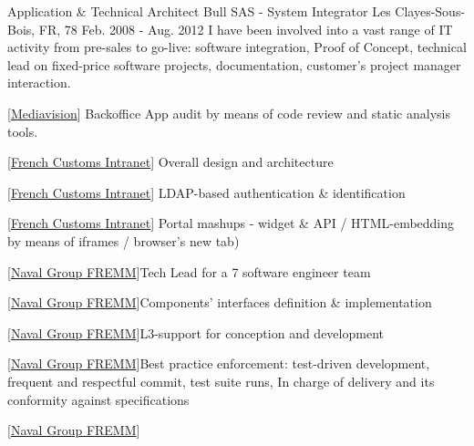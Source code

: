 \begin{cventries}
  \cventry
    {Application \& Technical Architect} %
    {Bull SAS - System Integrator} %
    {Les Clayes-Sous-Bois, FR, 78} %
    {Feb. 2008 - Aug. 2012} %
    {I have been involved into a vast range of IT activity from pre-sales to go-live: software integration, Proof of Concept, technical lead on fixed-price software projects, documentation, customer’s project manager interaction.}
    {
      \begin{cvitems} %
        \item {[\href{http://www.mediavision.fr}{Mediavision}] Backoffice App audit by means of code review and static analysis tools.}
        \item {[\href{http://www.douane.gouv.fr/articles/a13408-travel-coming-to-france-with-your-pet}{French Customs Intranet}] Overall design and architecture}
        \item {[\href{http://www.douane.gouv.fr/articles/a13408-travel-coming-to-france-with-your-pet}{French Customs Intranet}] LDAP-based authentication \& identification}
        \item {[\href{http://www.douane.gouv.fr/articles/a13408-travel-coming-to-france-with-your-pet}{French Customs Intranet}] Portal mashups - widget \& API / HTML-embedding by means of iframes / browser's new tab)}
        \item {[\href{https://www.naval-group.com/en/news/dcns-delivers-multi-mission-frigate-auvergne-the-fourth-fremm-for-the-french-navy/}{Naval Group FREMM}]Tech Lead for a 7 software engineer team}
        \item {[\href{https://www.naval-group.com/en/news/dcns-delivers-multi-mission-frigate-auvergne-the-fourth-fremm-for-the-french-navy/}{Naval Group FREMM}]Components’ interfaces definition \& implementation} 
        \item {[\href{https://www.naval-group.com/en/news/dcns-delivers-multi-mission-frigate-auvergne-the-fourth-fremm-for-the-french-navy/}{Naval Group FREMM}]L3-support for conception and development}
        \item {[\href{https://www.naval-group.com/en/news/dcns-delivers-multi-mission-frigate-auvergne-the-fourth-fremm-for-the-french-navy/}{Naval Group FREMM}]Best practice enforcement: test-driven development, frequent and respectful commit, test suite runs, In charge of delivery and its conformity against specifications}
        \item {[\href{https://www.naval-group.com/en/news/dcns-delivers-multi-mission-frigate-auvergne-the-fourth-fremm-for-the-french-navy/}{Naval Group FREMM}]}
      \end{cvitems}
    }


\end{cventries}
